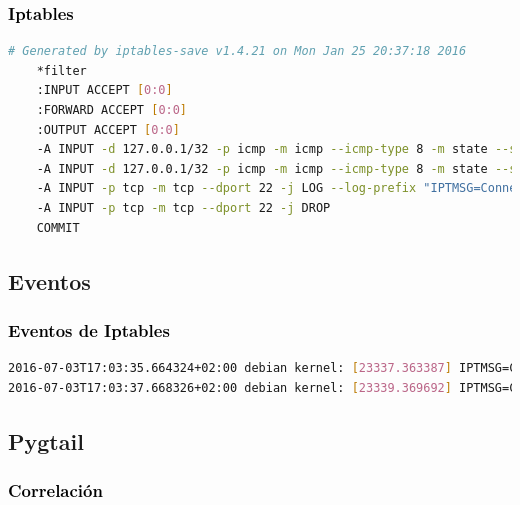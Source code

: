 \documentclass[xcolor=x11names,compress]{beamer}
\theoremstyle{cuadrado}
\begin{document}
{\begin{frame}[fragile]
  \frametitle{\textcolor{black}{Iptables}}

  \begin{lstlisting}[language=bash]
    # Generated by iptables-save v1.4.21 on Mon Jan 25 20:37:18 2016
    *filter
    :INPUT ACCEPT [0:0]
    :FORWARD ACCEPT [0:0]
    :OUTPUT ACCEPT [0:0]
    -A INPUT -d 127.0.0.1/32 -p icmp -m icmp --icmp-type 8 -m state --state NEW,RELATED,ESTABLISHED -j LOG --log-prefix "IPTMSG=Connection ICMP "
    -A INPUT -d 127.0.0.1/32 -p icmp -m icmp --icmp-type 8 -m state --state NEW,RELATED,ESTABLISHED -j DROP
    -A INPUT -p tcp -m tcp --dport 22 -j LOG --log-prefix "IPTMSG=Connection SSH "
    -A INPUT -p tcp -m tcp --dport 22 -j DROP
    COMMIT
  \end{lstlisting}
  \hspace*{1in}{Figura - Configuración reglas iptables}
\end{frame}

\subsection{Eventos}

\begin{frame}[fragile]
  \frametitle{\textcolor{black}{Eventos de Iptables}}

\begin{lstlisting}[language=bash, breaklines=true]
2016-07-03T17:03:35.664324+02:00 debian kernel: [23337.363387] IPTMSG=Connection SSH IN=lo OUT= MAC=00:00:00:00:00:00:00:00:00:00:00:00:08:00 SRC=127.0.0.1 DST=127.0.0.1 LEN=60 TOS=0x00 PREC=0x00 TTL=64 ID=39454 DF PROTO=TCP SPT=47706 DPT=22 WINDOW=43690 RES=0x00 SYN URGP=0
2016-07-03T17:03:37.668326+02:00 debian kernel: [23339.369692] IPTMSG=Connection SSH IN=lo OUT= MAC=00:00:00:00:00:00:00:00:00:00:00:00:08:00 SRC=127.0.0.1 DST=127.0.0.1 LEN=60 TOS=0x00 PREC=0x00 TTL=64 ID=39455 DF PROTO=TCP SPT=47706 DPT=22 WINDOW=43690 RES=0x00 SYN URGP=0
\end{lstlisting}
\hspace*{.3in}{Figura - Log capturado y almacenado por rsyslog en /var/log/iptables.log}
\end{frame}

\subsection{Pygtail}

\begin{frame}[fragile]
  \frametitle{\textcolor{black}{Correlación}}
  
  \hspace*{.5in}{Figura - Instancia de la clase Pygtail y lectura de las líneas del log}
\end{frame}
}
\end{document}
